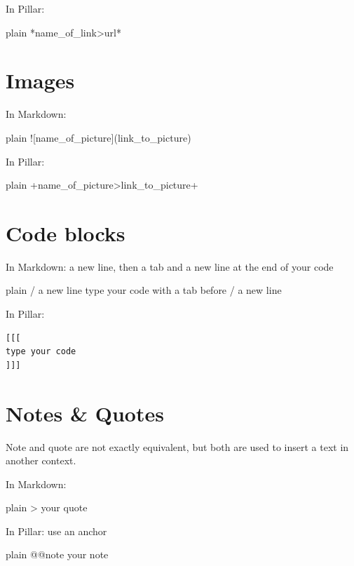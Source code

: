 \documentclass[10pt,twoside,english]{_support/latex/sbabook/sbabook}
\begin{document}
In Pillar:

\begin{displaycode}{plain}
*name_of_link>url*
\end{displaycode}
\section{Images}
In Markdown:

\begin{displaycode}{plain}
![name_of_picture](link_to_picture)
\end{displaycode}

In Pillar:

\begin{displaycode}{plain}
+name_of_picture>link_to_picture+
\end{displaycode}
\section{Code blocks}
In Markdown: a new line, then a tab and a new line at the end of your code

\begin{displaycode}{plain}
/ a new line
    type your code with a tab before
/ a new line
\end{displaycode}

In Pillar:

\begin{verbatim}
[[[
type your code
]]]
\end{verbatim}
\section{Notes \& Quotes}
Note and quote are not exactly equivalent, but both are used to insert a text in another context.

In Markdown:

\begin{displaycode}{plain}
> your quote
\end{displaycode}

In Pillar: use an anchor

\begin{displaycode}{plain}
@@note your note
\end{displaycode}






\backmatter

\end{document}
